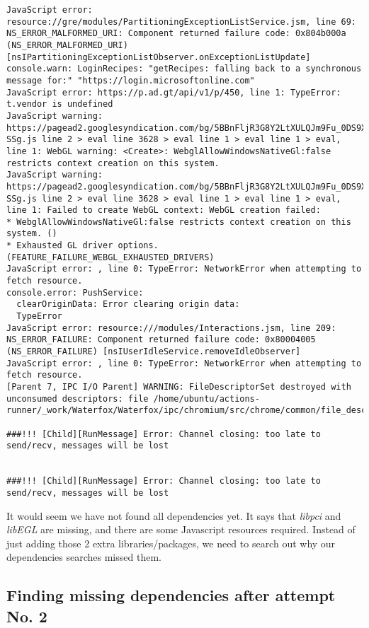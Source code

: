 \documentclass{article}  %
\begin{document}
\begin{verbatim}
JavaScript error: resource://gre/modules/PartitioningExceptionListService.jsm, line 69: NS_ERROR_MALFORMED_URI: Component returned failure code: 0x804b000a (NS_ERROR_MALFORMED_URI) [nsIPartitioningExceptionListObserver.onExceptionListUpdate]
console.warn: LoginRecipes: "getRecipes: falling back to a synchronous message for:" "https://login.microsoftonline.com"
JavaScript error: https://p.ad.gt/api/v1/p/450, line 1: TypeError: t.vendor is undefined
JavaScript warning: https://pagead2.googlesyndication.com/bg/5BBnFljR3G8Y2LtXULQJm9Fu_0DS9XrGSjZ8CuJ-SSg.js line 2 > eval line 3628 > eval line 1 > eval line 1 > eval, line 1: WebGL warning: <Create>: WebglAllowWindowsNativeGl:false restricts context creation on this system.
JavaScript warning: https://pagead2.googlesyndication.com/bg/5BBnFljR3G8Y2LtXULQJm9Fu_0DS9XrGSjZ8CuJ-SSg.js line 2 > eval line 3628 > eval line 1 > eval line 1 > eval, line 1: Failed to create WebGL context: WebGL creation failed: 
* WebglAllowWindowsNativeGl:false restricts context creation on this system. ()
* Exhausted GL driver options. (FEATURE_FAILURE_WEBGL_EXHAUSTED_DRIVERS)
JavaScript error: , line 0: TypeError: NetworkError when attempting to fetch resource.
console.error: PushService: 
  clearOriginData: Error clearing origin data:
  TypeError
JavaScript error: resource:///modules/Interactions.jsm, line 209: NS_ERROR_FAILURE: Component returned failure code: 0x80004005 (NS_ERROR_FAILURE) [nsIUserIdleService.removeIdleObserver]
JavaScript error: , line 0: TypeError: NetworkError when attempting to fetch resource.
[Parent 7, IPC I/O Parent] WARNING: FileDescriptorSet destroyed with unconsumed descriptors: file /home/ubuntu/actions-runner/_work/Waterfox/Waterfox/ipc/chromium/src/chrome/common/file_descriptor_set_posix.cc:19

###!!! [Child][RunMessage] Error: Channel closing: too late to send/recv, messages will be lost


###!!! [Child][RunMessage] Error: Channel closing: too late to send/recv, messages will be lost

\end{verbatim}
It would seem we have not found all dependencies yet. It says that {\em libpci} and {\em libEGL} are missing, and there are some Javascript resources required.
Instead of just adding those 2 extra libraries/packages, we need to search out why our dependencies searches missed them.

\subsection{Finding missing dependencies after attempt No. 2}
\end{document}
